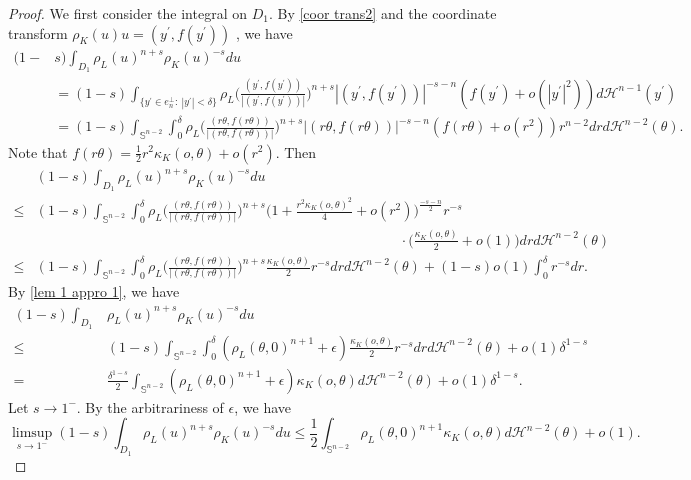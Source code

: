 \documentclass[12pt, oneside,reqno]{amsart}
\numberwithin{equation}{section}
\newtheorem{definition and theorem}[theorem]{Definition and Theorem}
\theoremstyle{plain}
\theoremstyle{remark}
\theoremstyle{definition}
\newcommand{\tH}{\mathcal{H}}
\begin{document}
\begin{proof}
    We first consider the integral on $D_1$. By \eqref{coor trans2} and the coordinate transform $\rho_K(u)u=(y^{\prime}, f(y^{\prime}))$ , we have
    \begin{align*}
        (1-&s)\int_{D_1}\rho_L(u)^{n+s}\rho_K(u)^{-s}du\\
        &=(1-s)\int_{\{y^{\prime}\in e_n^{\perp}:~|y^{\prime}|<\delta\}}\rho_L\Big(\frac{(y^{\prime},f(y^{\prime}))}{|(y^{\prime},f(y^{\prime}))|}\Big)^{n+s}|(y^{\prime},f(y^{\prime}))|^{-s-n}(f(y^{\prime})+o(|y^{\prime}|^2))d\tH^{n-1}(y^{\prime})\\
        &=(1-s)\int_{\mathbb S^{n-2}}\int_0^{\delta}\rho_L\Big(\frac{(r\theta,f(r\theta))}{|(r\theta,f(r\theta))|}\Big)^{n+s}|(r\theta,f(r\theta))|^{-s-n}(f(r\theta)+o(r^2))r^{n-2}drd\tH^{n-2}(\theta).
    \end{align*}
    Note that $f(r\theta)=\frac{1}{2}r^2\kappa_K(o,\theta)+o(r^2)$. Then
    \begin{align*}
        &(1-s)\int_{D_1}\rho_L(u)^{n+s}\rho_K(u)^{-s}du\\
        \leq &(1-s)\int_{\mathbb S^{n-2}}\int_0^{\delta} \rho_L\Big(\frac{(r\theta,f(r\theta))}{|(r\theta,f(r\theta))|}\Big)^{n+s}\Big(1+\frac{r^2\kappa_K(o,\theta)^2}{4}+o(r^2)\Big)^{\frac{-s-n}{2}}r^{-s}\\ 
        & \quad\quad\quad\quad\quad\quad\quad\quad\quad\quad\quad\quad\quad\quad\quad\quad\quad\quad\quad\quad\quad\quad\quad\quad\quad\quad\cdot\Big(\frac{\kappa_K(o,\theta)}{2}+o(1)\Big)drd\tH^{n-2}(\theta)\\
        \leq &(1-s)\int_{\mathbb S^{n-2}}\int_0^{\delta}\rho_L\Big(\frac{(r\theta,f(r\theta))}{|(r\theta,f(r\theta))|}\Big)^{n+s}\frac{\kappa_K(o,\theta)}{2}r^{-s}drd\tH^{n-2}(\theta)+(1-s)o(1)\int
        _0^{\delta}r^{-s}dr.
    \end{align*}
    By \eqref{lem 1 appro 1}, we have
    \begin{align*}
        (1-s)\int_{D_1}&\rho_L(u)^{n+s}\rho_K(u)^{-s}du\\
        \leq &(1-s)\int_{\mathbb S^{n-2}}\int_0^{\delta}(\rho_L(\theta,0)^{n+1}+\epsilon)\frac{\kappa_K(o,\theta)}{2}r^{-s}drd\tH^{n-2}(\theta)+o(1)\delta^{1-s}\\
        =&\frac{\delta^{1-s}}{2}\int_{\mathbb S^{n-2}}(\rho_L(\theta,0)^{n+1}+\epsilon)\kappa_K(o,\theta)d\tH^{n-2}(\theta)+o(1)\delta^{1-s}.
    \end{align*}
    Let $s\rightarrow 1^{-}$. By the arbitrariness of $\epsilon$, we have
    \[\limsup_{s\rightarrow1^-}(1-s)\int_{D_1}\rho_L(u)^{n+s}\rho_K(u)^{-s}du\leq \frac{1}{2}\int_{\mathbb S^{n-2}}\rho_L(\theta,0)^{n+1}\kappa_K(o,\theta)d\tH^{n-2}(\theta)+o(1).\]


\end{proof}
\end{document}
